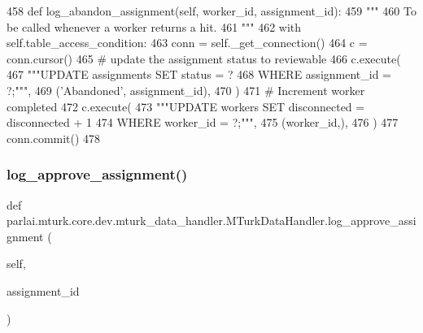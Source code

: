 \begin{DoxyCode}
458     \textcolor{keyword}{def }log\_abandon\_assignment(self, worker\_id, assignment\_id):
459         \textcolor{stringliteral}{"""}
460 \textcolor{stringliteral}{        To be called whenever a worker returns a hit.}
461 \textcolor{stringliteral}{        """}
462         with self.table\_access\_condition:
463             conn = self.\_get\_connection()
464             c = conn.cursor()
465             \textcolor{comment}{# update the assignment status to reviewable}
466             c.execute(
467                 \textcolor{stringliteral}{"""UPDATE assignments SET status = ?}
468 \textcolor{stringliteral}{                         WHERE assignment\_id = ?;"""},
469                 (\textcolor{stringliteral}{'Abandoned'}, assignment\_id),
470             )
471             \textcolor{comment}{# Increment worker completed}
472             c.execute(
473                 \textcolor{stringliteral}{"""UPDATE workers SET disconnected = disconnected + 1}
474 \textcolor{stringliteral}{                         WHERE worker\_id = ?;"""},
475                 (worker\_id,),
476             )
477             conn.commit()
478 
\end{DoxyCode}
\mbox{\label{classparlai_1_1mturk_1_1core_1_1dev_1_1mturk__data__handler_1_1MTurkDataHandler_a57266a8380587e0256b966ad780ec7d7}} 
\subsubsection{\texorpdfstring{log\+\_\+approve\+\_\+assignment()}{log\_approve\_assignment()}}
{\footnotesize\ttfamily def parlai.\+mturk.\+core.\+dev.\+mturk\+\_\+data\+\_\+handler.\+M\+Turk\+Data\+Handler.\+log\+\_\+approve\+\_\+assignment (\begin{DoxyParamCaption}\item[{}]{self,  }\item[{}]{assignment\+\_\+id }\end{DoxyParamCaption})}

